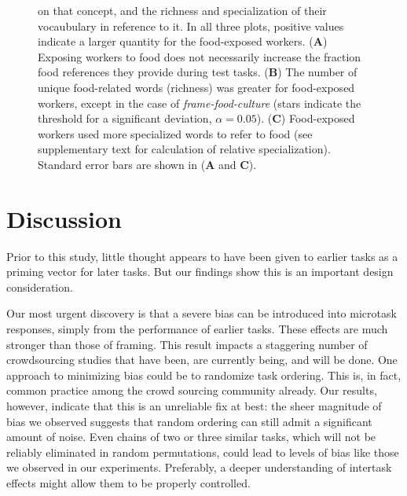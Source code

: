 \documentclass{pnastwo}
\begin{document}
\begin{article}
\begin{figure}[t]
{		on that concept, and the richness and specialization of their 
		vocaubulary in reference to it.
		In all three plots, positive values indicate a larger quantity for 
		the food-exposed workers.
		(\textbf{A}) Exposing workers to food does not necessarily increase
		the fraction food references they provide during test tasks.
		(\textbf{B}) The number of unique food-related
		words (richness) was greater for food-exposed workers, except in the 
		case of \textit{frame-food-culture} (stars indicate the threshold
		for a significant deviation, $\alpha=0.05$). 
		(\textbf{C}) Food-exposed
		workers used more specialized words to refer to food (see 
		supplementary text for calculation of relative specialization).
		Standard error bars are shown in (\textbf{A} and \textbf{C}).
	}
	\label{fig:specificity}
\end{figure}

\section{Discussion}

Prior to this study, little thought appears to have been given to earlier tasks
as a priming vector for later tasks.  But our findings show this is an
important design consideration. 

Our most urgent discovery is that a severe bias can be introduced into
microtask responses, simply from the performance of earlier tasks.  These
effects are much stronger than those of framing. This result impacts a
staggering number of crowdsourcing studies that have been, are currently being,
and will be done.  One approach to minimizing bias could be to randomize task
ordering. This is, in fact, common practice among the crowd sourcing
community already.  Our results, however, indicate that this is an unreliable fix
at best: the sheer magnitude of bias we observed suggests that random ordering
can still admit a significant amount of noise.  Even chains of two or three
similar tasks, which will not be reliably eliminated in random permutations,
could lead to levels of bias like those we observed in our experiments.
Preferably, a deeper understanding of intertask effects might allow them to be
properly controlled.


\end{article}
\end{document}
